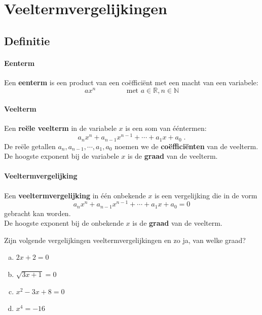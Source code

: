 \documentclass[12pt]{article}
\begin{document}
\onehalfspacing

\section{Veeltermvergelijkingen}

\begin{theorie}

\subsection{Definitie}

\paragraph{Eenterm}
\begin{mdframed}
Een {\bf eenterm} is een product van een coëfficiënt met een macht van een variabele:
$$ax^n\qquad\qquad\mbox{ met }a\in\mathbb{R}, n\in\mathbb{N}$$
\end{mdframed}

\paragraph{Veelterm}
\begin{mdframed}
  Een {\bf reële veelterm} in de variabele $x$ is een som van ééntermen:
  $$ a_nx^n + a_{n-1}x^{n-1} + \cdots + a_1x + a_0 \;.$$
  De reële getallen $a_n, a_{n-1}, \cdots, a_1, a_0$ noemen we de {\bf coëfficiënten} van de veelterm.
  De hoogste exponent bij de variabele $x$ is de {\bf graad} van de veelterm.
\end{mdframed}

\paragraph{Veeltermvergelijking}
\begin{mdframed}
  Een {\bf veeltermvergelijking} in één onbekende $x$ is een vergelijking die in de vorm
  $$a_nx^n + a_{n-1}x^{n-1} + \cdots + a_1x + a_0 = 0$$
  gebracht kan worden.\\
  De hoogste exponent bij de onbekende $x$ is de {\bf graad} van de veelterm.
\end{mdframed}

\end{theorie}

\begin{oefening}
  Zijn volgende vergelijkingen veeltermvergelijkingen en zo ja, van welke graad?
  \begin{multicols}{2}
    \begin{enumerate}[(a)]
    \item $2x + 2 = 0$
    \item $\sqrt{3x+1} = 0$
    \item $x^2-3x+8=0$
    \item $x^4=-16$
    \end{enumerate}
  \end{multicols}
\end{oefening}
\end{document}
